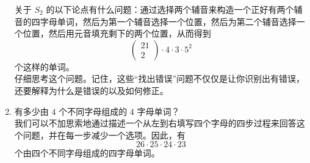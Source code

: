 \begin{example}
\begin{enumerate}
              关于 $S_2$ 的以下论点有什么问题：通过选择两个辅音来构造一个正好有两个辅音的四字母单词，然后为第一个辅音选择一个位置，然后为第二个辅音选择一个位置，然后用元音填充剩下的两个位置，从而得到
              \[\begin{pmatrix} 21\\2 \end{pmatrix} \cdot 4 \cdot 3 \cdot 5^2\]
              个这样的单词。\\

              仔细思考这个问题。记住，这些``找出错误''问题不仅仅是让你识别出有错误，还要解释为什么是错误的以及如何修正。
        \item 有多少由 $4$ 个不同字母组成的 $4$ 字母单词？\\
              我们可以不加思索地通过描述一个从左到右填写四个字母的四步过程来回答这个问题，并在每一步减少一个选项。因此，有
              \[26 \cdot 25 \cdot 24 \cdot 23\]
              个由四个不同字母组成的四字母单词。\\


\end{enumerate}
\end{example}
